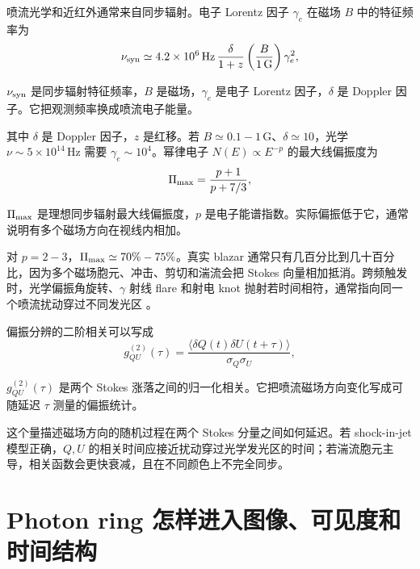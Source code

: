 喷流光学和近红外通常来自同步辐射。电子 Lorentz 因子 \(\gamma_e\) 在磁场 \(B\) 中的特征频率为
\begin{equation}
  \nu_{\rm syn}\simeq
  4.2\times10^6\,{\rm Hz}\,
  \frac{\delta}{1+z}
  \left(\frac{B}{1\,{\rm G}}\right)\gamma_e^2 ,
  \label{eq:ch12-15}
\end{equation}
\begin{formulaexplain}
\(\nu_{\rm syn}\) 是同步辐射特征频率，\(B\) 是磁场，\(\gamma_e\) 是电子 Lorentz 因子，\(\delta\) 是 Doppler 因子。它把观测频率换成喷流电子能量。
\end{formulaexplain}
其中 \(\delta\) 是 Doppler 因子，\(z\) 是红移。若 \(B\simeq0.1-1\,\mathrm{G}\)、\(\delta\simeq10\)，光学 \(\nu\sim5\times10^{14}\,\mathrm{Hz}\) 需要 \(\gamma_e\sim10^4\)。幂律电子 \(N(E)\propto E^{-p}\) 的最大线偏振度为
\begin{equation}
  \Pi_{\rm max}=\frac{p+1}{p+7/3},
  \label{eq:ch12-16}
\end{equation}
\begin{formulaexplain}
\(\Pi_{\rm max}\) 是理想同步辐射最大线偏振度，\(p\) 是电子能谱指数。实际偏振低于它，通常说明有多个磁场方向在视线内相加。
\end{formulaexplain}
对 \(p=2-3\)，\(\Pi_{\rm max}\simeq70\%-75\%\)。真实 blazar 通常只有几百分比到几十百分比，因为多个磁场胞元、冲击、剪切和湍流会把 Stokes 向量相加抵消。跨频触发时，光学偏振角旋转、\(\gamma\) 射线 flare 和射电 knot 抛射若时间相符，通常指向同一个喷流扰动穿过不同发光区 \citep{1995PASP..107..803U,2008Natur.452..966M}。

偏振分辨的二阶相关可以写成
\begin{equation}
  g^{(2)}_{QU}(\tau)=
  \frac{\langle \delta Q(t)\delta U(t+\tau)\rangle}
  {\sigma_Q\sigma_U},
  \label{eq:ch12-17}
\end{equation}
\begin{formulaexplain}
\(g^{(2)}_{QU}(\tau)\) 是两个 Stokes 涨落之间的归一化相关。它把喷流磁场方向变化写成可随延迟 \(\tau\) 测量的偏振统计。
\end{formulaexplain}
这个量描述磁场方向的随机过程在两个 Stokes 分量之间如何延迟。若 shock-in-jet 模型正确，\(Q,U\) 的相关时间应接近扰动穿过光学发光区的时间；若湍流胞元主导，相关函数会更快衰减，且在不同颜色上不完全同步。

\section{Photon ring 怎样进入图像、可见度和时间结构}

